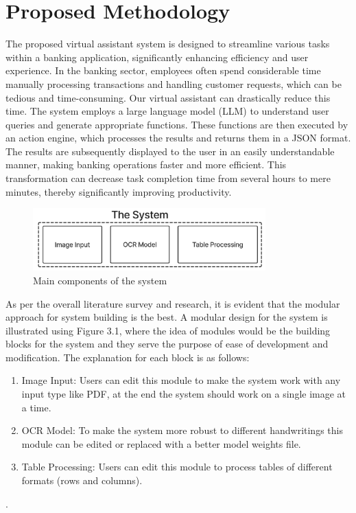 \chapter{Proposed Methodology}

The proposed virtual assistant system is designed to streamline various tasks within a banking application, significantly enhancing efficiency and user experience. In the banking sector, employees often spend considerable time manually processing transactions and handling customer requests, which can be tedious and time-consuming. Our virtual assistant can drastically reduce this time. The system employs a large language model (LLM) to understand user queries and generate appropriate functions. These functions are then executed by an action engine, which processes the results and returns them in a JSON format. The results are subsequently displayed to the user in an easily understandable manner, making banking operations faster and more efficient. This transformation can decrease task completion time from several hours to mere minutes, thereby significantly improving productivity.

\vspace{1.5mm}

\begin{figure}[h!]
    \centering
    \includegraphics[width=0.8\textwidth]{Images/lit_review/main_components_of_MP.jpg}
    \caption{Main components of the system}
\end{figure}

\noindent
As per the overall literature survey and research, it is evident that the modular approach for system building is the best. A modular design for the system is illustrated using Figure 3.1, where the idea of modules would be the building blocks for the system and they serve the purpose of ease of development and modification. The explanation for each block is as follows: 

\clearpage

\begin{enumerate}
    \item Image Input: Users can edit this module to make the system work with any input type like PDF, at the end the system should work on a single image at a time.
    \item OCR Model: To make the system more robust to different handwritings this module can be edited or replaced with a better model weights file. 
    \item Table Processing: Users can edit this module to process tables of different formats (rows and columns).
\end{enumerate}.

